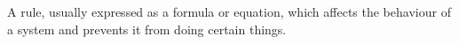 A rule, usually expressed as a formula or equation,
which affects the behaviour of a system and prevents
it from doing certain things.